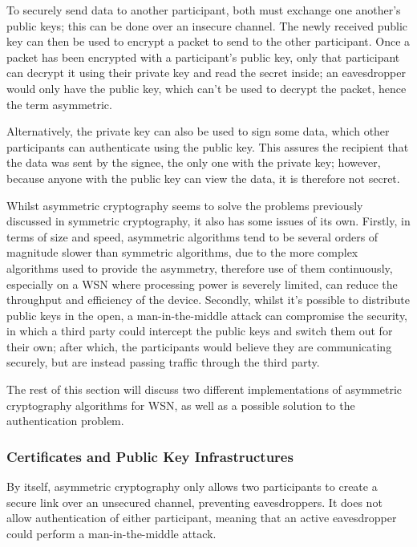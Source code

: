 \documentclass{mprop}
\begin{document}
To securely send data to another participant, both must exchange one another's public keys; this can be done over an insecure channel. The newly received public key can then be used to encrypt a packet to send to the other participant. Once a packet has been encrypted with a participant's public key, only that participant can decrypt it using their private key and read the secret inside; an eavesdropper would only have the public key, which can't be used to decrypt the packet, hence the term asymmetric. 

Alternatively, the private key can also be used to sign some data, which other participants can authenticate using the public key. This assures the recipient that the data was sent by the signee, the only one with the private key; however, because anyone with the public key can view the data, it is therefore not secret.

Whilst asymmetric cryptography seems to solve the problems previously discussed in symmetric cryptography, it also has some issues of its own. Firstly, in terms of size and speed, asymmetric algorithms tend to be several orders of magnitude slower than symmetric algorithms, due to the more complex algorithms used to provide the asymmetry, therefore use of them continuously, especially on a WSN where processing power is severely limited, can reduce the throughput and efficiency of the device.
Secondly, whilst it's possible to distribute public keys in the open, a man-in-the-middle attack can compromise the security, in which a third party could intercept the public keys and switch them out for their own; after which, the participants would believe they are communicating securely, but are instead passing traffic through the third party.

The rest of this section will discuss two different implementations of asymmetric cryptography algorithms for WSN, as well as a possible solution to the authentication problem.

\subsubsection{Certificates and Public Key Infrastructures} %
\label{ssub:certificates_and_public_key_infrastructures}
By itself, asymmetric cryptography only allows two participants to create a secure link over an unsecured channel, preventing eavesdroppers. It does not allow authentication of either participant, meaning that an active eavesdropper could perform a man-in-the-middle attack. 
\end{document}
